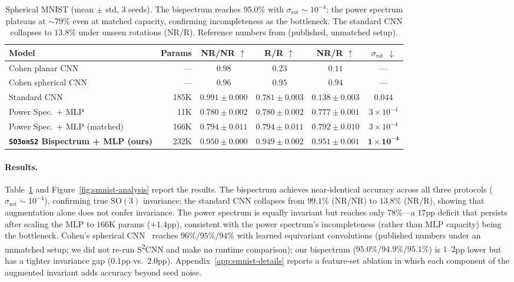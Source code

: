 \documentclass{article}
\theoremstyle{definition}
\theoremstyle{remark}
\newcommand{\SO}{\mathrm{SO}}
\theoremstyle{definition}
\begin{document}
\begin{table}[tbp]
  \caption{Spherical MNIST (mean $\pm$ std, 3 seeds). The bispectrum
    reaches $95.0\%$ with $\sigma_{\mathrm{rot}} \sim 10^{-4}$; the
    power spectrum plateaus at ${\sim}79\%$ even at matched capacity,
    confirming incompleteness as the bottleneck. The standard CNN
    collapses to $13.8\%$ under unseen rotations (NR/R).
    Reference numbers from \citet{cohen2018spherical}
    (published, unmatched setup).}
  \label{tab:smnist-results}
  \centering
  \small
  \setlength{\tabcolsep}{2.5pt}
  \begin{tabular}{lrcccc}
    \toprule
    Model & Params & NR/NR $\uparrow$ & R/R $\uparrow$ & NR/R $\uparrow$
      & $\sigma_{\mathrm{rot}}$ $\downarrow$ \\
    \midrule
    Cohen planar CNN & --- & $0.98$ & $0.23$ & $0.11$ & --- \\
    Cohen spherical CNN & --- & $0.96$ & $0.95$ & $0.94$ & --- \\
    \midrule
    Standard CNN & 185K
      & $\mathbf{0.991 {\pm} 0.000}$ & $0.781 {\pm} 0.003$ & $0.138 {\pm} 0.003$
      & $0.044$ \\
    Power Spec.\ + MLP & 11K
      & $0.780 {\pm} 0.002$ & $0.780 {\pm} 0.002$ & $0.777 {\pm} 0.001$
      & $3{\times}10^{-4}$ \\
    Power Spec.\ + MLP (matched) & 166K
      & $0.794 {\pm} 0.011$ & $0.794 {\pm} 0.011$ & $0.792 {\pm} 0.010$
      & $3{\times}10^{-4}$ \\
    \textbf{\texttt{SO3onS2} Bispectrum + MLP (ours)} & 232K
      & $0.950 {\pm} 0.000$ & $\mathbf{0.949 {\pm} 0.002}$
      & $\mathbf{0.951 {\pm} 0.001}$ & $\mathbf{1{\times}10^{-4}}$ \\
    \bottomrule
  \end{tabular}
\end{table}

\paragraph{Results.}
Table~\ref{tab:smnist-results} and
Figure~\ref{fig:smnist-analysis} report the results.
The bispectrum achieves near-identical accuracy across all three
protocols ($\sigma_{\mathrm{rot}}{\sim}10^{-4}$), confirming true
$\SO(3)$ invariance; the standard CNN collapses from $99.1\%$
(NR/NR) to $13.8\%$ (NR/R), showing that augmentation alone does not
confer invariance. The power spectrum is equally invariant but
reaches only $78\%$---a $17$pp deficit that persists after scaling
the MLP to $166$K params (${+}1.4$pp), consistent with the power
spectrum's incompleteness (rather than MLP capacity) being the
bottleneck. Cohen's spherical CNN~\citep{cohen2018spherical} reaches
$96\%/95\%/94\%$ with learned equivariant convolutions (published
numbers under an unmatched setup; we did not re-run S\textsuperscript{2}CNN and
make no runtime comparison); our bispectrum
($95.0\%/94.9\%/95.1\%$) is $1$--$2$pp lower
but has a tighter invariance gap ($0.1$pp vs.\ $2.0$pp).
Appendix~\ref{app:smnist-details} reports a feature-set ablation in
which each component of the augmented invariant adds accuracy beyond
seed noise.
\end{document}
